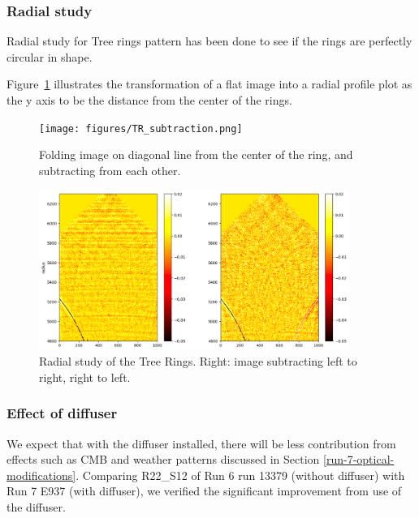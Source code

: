 \subsubsection{Radial study}
Radial study for Tree rings pattern has been done to see if the rings are perfectly circular in shape. 

Figure~\ref{fig:tree-ring-radial-transform} illustrates the transformation of a flat image into a radial profile plot as the y axis to be the distance from the center of the rings. 

\begin{figure}[ht]
\centering
\texttt{[image: figures/TR\_subtraction.png]}
\caption{Folding image on diagonal line from the center of the ring, and subtracting from each other.}
\label{fig:tree-ring-radial-transform}
\end{figure}

\begin{figure}[ht]
\centering
\includegraphics[width=0.9\textwidth]{figures/TR_radial.png}
\caption{Radial study of the Tree Rings. Right: image subtracting left to right, right to left.}
\end{figure}

\subsubsection{Effect of diffuser}
We expect that with the diffuser installed, there will be less contribution from effects such as CMB and weather patterns discussed in Section \ref{run-7-optical-modifications}. Comparing R22\_S12 of Run 6 run 13379 (without diffuser) with Run 7 E937 (with diffuser), we verified the significant improvement from use of the diffuser.


